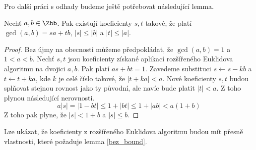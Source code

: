 Pro další práci s odhady budeme ještě potřebovat následující lemma.
\begin{lem} \label{bez_bound}
Nechť $ a, b \in \Zbb $. Pak existují koeficienty
$ s, t $ takové, že platí $ \gcd(a, b) = s a + t b $, $ |s| \leq |b| $ a
$ |t| \leq |a| $.
\end{lem}
\begin{proof}
Bez újmy na obecnosti můžeme předpokládat, že $ \gcd(a, b) = 1 $ a $ 1 < a < b $.
Nechť $ s, t $ jsou koeficienty získané aplikací rozšířeného Euklidova algoritmu
na dvojici $ a, b $. Pak platí $ a s + b t = 1 $. Zavedeme substituci
$ s \leftarrow s - k b $ a $ t \leftarrow t + k a $, kde $ k $ je celé číslo takové, že
$ |t + k a| < a $. Nové koeficienty $ s,t $ budou splňovat stejnou rovnost
jako ty původní, ale navíc bude platit $ |t| < a $. Z toho plynou následující
nerovnosti.
\begin{equation*}
    a |s| = | 1 - bt | \leq 1 + |bt| \leq 1 + |ab| < a(1 + b)
\end{equation*}
Z toho pak plyne, že $ |s| < 1 + b $ a $ |s| \leq b $.
\end{proof}
\begin{pozn}
Lze ukázat, že koeficienty z rozšířeného Euklidova algoritmu budou mít přesně
vlastnosti, které požaduje lemma \ref{bez_bound}.
\end{pozn}



